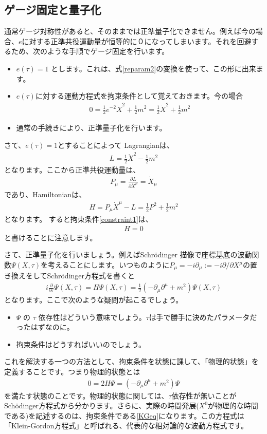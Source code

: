 \documentclass[report,paper=a4, fontsize=12pt, line_length=16cm, number_of_lines=34,dvipdfmx]{jlreq}
\numberwithin{equation}{chapter}
\numberwithin{equation}{section}
\newcommand{\del}{\partial}
\begin{document}
\subsection{ゲージ固定と量子化}
通常ゲージ対称性があると、そのままでは正準量子化できません。例えば今の場合、$e$に対する正準共役運動量が恒等的に０になってしまいます。それを回避するため、次のような手順でゲージ固定を行います。
\begin{itemize}
 \item $e(\tau)=1$ とします。これは、式\eqref{reparam2}の変換を使って、この形に出来ます。
 \item $e(\tau)$に対する運動方程式を拘束条件として覚えておきます。今の場合
\begin{align}
 0=\frac12 e^{-2}\dot{X}^2+\frac12 m^2=\frac12 \dot{X}^2+\frac12 m^2 \label{constraint1}
\end{align}
 \item 通常の手続きにより、正準量子化を行います。
\end{itemize}
さて、$e(\tau)=1$とすることによって Lagrangianは、
\begin{align}
 L=\frac12 \dot{X}^2-\frac12 m^2
\end{align}
となります。ここから正準共役運動量は、
\begin{align}
 P_{\mu}=\frac{\del L}{\del \dot{X}^{\mu}}=\dot{X}_{\mu}
\end{align}
であり、Hamiltonianは、
\begin{align}
 H=P_{\mu}\dot{X}^{\mu}-L=\frac12 P^2+\frac12 m^2
\end{align}
となります。 すると拘束条件\eqref{constraint1}は、
\begin{align}
 H=0
\end{align}
と書けることに注意します。

さて、正準量子化を行いましょう。例えばSchr\"odinger 描像で座標基底の波動関数$\Psi(X,\tau)$を考えることにします。いつものように$P_{\mu}=-i\del_{\mu}:=-i\del/\del X^{\mu}$の置き換えをしてSchr\"odinger方程式を書くと
\begin{align}
 i\frac{\del}{\del \tau}\Psi(X,\tau)= H \Psi(X,\tau)=\frac12 (-\del_{\mu}\del^{\mu}+m^2)\Psi(X,\tau)
\end{align}
となります。ここで次のような疑問が起こるでしょう。
\begin{itemize}
 \item $\Psi$ の $\tau$ 依存性はどういう意味でしょう。$\tau$は手で勝手に決めたパラメータだったはずなのに。
 \item 拘束条件はどうすればいいのでしょう。
\end{itemize}
これを解決する一つの方法として、拘束条件を状態に課して、「物理的状態」を定義することです。つまり物理的状態とは
\begin{align}
 0=2H\Psi=(-\del_{\mu}\del^{\mu}+m^2)\Psi \label{KGeq}
\end{align}
を満たす状態のことです。物理的状態に関しては、$\tau$依存性が無いことがSch\"odinger方程式から分かります。さらに、実際の時間発展($X^0$が物理的な時間である)を記述するのは、拘束条件である\eqref{KGeq}になります。この方程式は「Klein-Gordon方程式」と呼ばれる、代表的な相対論的な波動方程式です。
\end{document}
